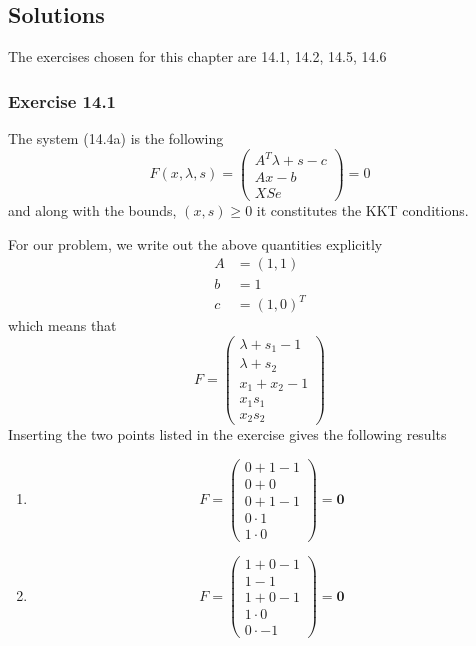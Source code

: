 \subsection{Solutions}
The exercises chosen for this chapter are 14.1, 14.2, 14.5, 14.6
\subsubsection{Exercise 14.1}
The system (14.4a) is the following
\[
    F(x,\lambda, s) = \begin{pmatrix}
        A^T\lambda + s - c \\
        Ax - b             \\
        XSe
    \end{pmatrix} = 0
\]
and along with the bounds, $(x, s) \geq 0$ it constitutes the KKT conditions.

For our problem, we write out the above quantities explicitly
\begin{align*}
    A & = (1, 1)   \\
    b & = 1        \\
    c & = (1, 0)^T
\end{align*}
which means that
\[
    F = \begin{pmatrix}
        \lambda + s_1 - 1 \\
        \lambda + s_2     \\
        x_1 + x_2 - 1     \\
        x_1s_1            \\
        x_2s_2
    \end{pmatrix}
\]
Inserting the two points listed in the exercise gives the following results
\begin{enumerate}
    \item[\textit{Actual Solution}: ]
          \[
              F = \begin{pmatrix}
                  0 + 1 - 1 \\
                  0 + 0     \\
                  0 + 1 - 1 \\
                  0 \cdot 1 \\
                  1 \cdot 0
              \end{pmatrix} = \mathbf{0}
          \]
    \item[\textit{Spurious Solution}: ]
          \[
              F = \begin{pmatrix}
                  1 + 0 - 1 \\
                  1 - 1     \\
                  1 + 0 - 1 \\
                  1 \cdot 0 \\
                  0 \cdot -1
              \end{pmatrix} = \mathbf{0}
          \]
\end{enumerate}

